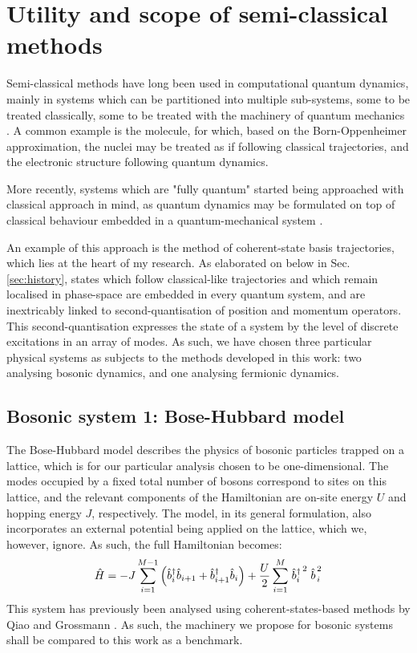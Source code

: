 \section{Utility and scope of semi-classical methods}
Semi-classical methods have long been used in computational quantum dynamics, mainly in systems which can be partitioned into multiple sub-systems, some to be treated classically, some to be treated with the machinery of quantum mechanics \cite{semiclassical_generic_1}. A common example is the molecule, for which, based on the Born-Oppenheimer approximation, the nuclei may be treated as if following classical trajectories, and the electronic structure following quantum dynamics.

More recently, systems which are "fully quantum" started being approached with classical approach in mind, as quantum dynamics may be formulated on top of classical behaviour embedded in a quantum-mechanical system \cite{semiclassical_generic_2}.

An example of this approach is the method of coherent-state basis trajectories, which lies at the heart of my research. As elaborated on below in Sec. \ref{sec:history}, states which follow classical-like trajectories and which remain localised in phase-space are embedded in every quantum system, and are inextricably linked to second-quantisation of position and momentum operators. This second-quantisation expresses the state of a system by the level of discrete excitations in an array of modes. As such, we have chosen three particular physical systems as subjects to the methods developed in this work: two analysing bosonic dynamics, and one analysing fermionic dynamics.
	
\subsection{Bosonic system 1: Bose-Hubbard model} \label{sec:bosonic1}
The Bose-Hubbard model describes the physics of bosonic particles trapped on a lattice, which is for our particular analysis chosen to be one-dimensional. The modes occupied by a fixed total number of bosons correspond to sites on this lattice, and the relevant components of the Hamiltonian are on-site energy $U$ and hopping energy $J$, respectively. The model, in its general formulation, also incorporates an external potential being applied on the lattice, which we, however, ignore. As such, the full Hamiltonian becomes:
\begin{equation}
\hat{H}=-J\sum_{i=1}^{M-1}\left(\hat{b}_i^\dagger\hat{b}_{i+1}+\hat{b}_{i+1}^\dagger\hat{b}_{i}\right)+\frac{U}{2}\sum_{i=1}^{M}\left.\hat{b}_i^\dagger\right.^2\left.\hat{b}\right.^2_i
\end{equation}
This system has previously been analysed using coherent-states-based methods by Qiao and Grossmann \cite{grossmann}. As such, the machinery we propose for bosonic systems shall be compared to this work as a benchmark.

